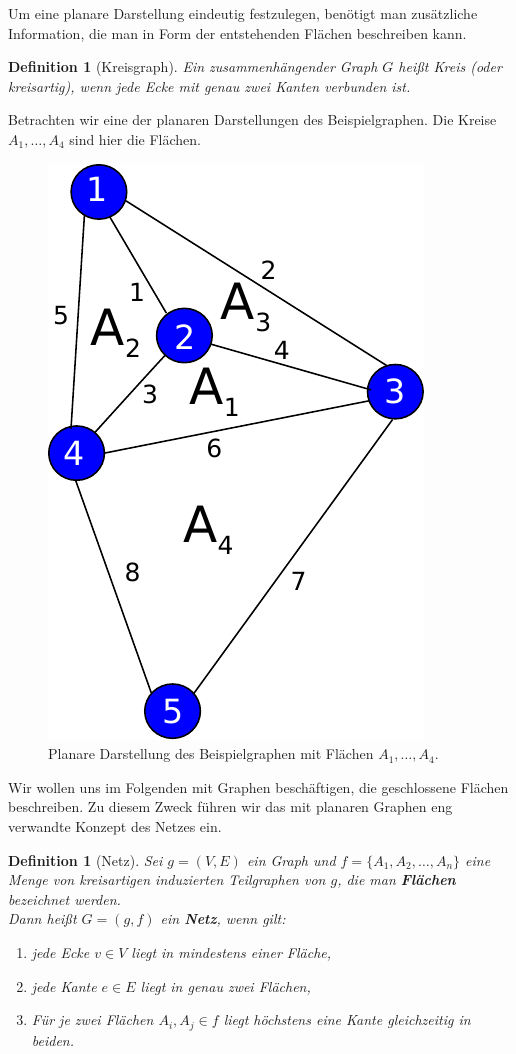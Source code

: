 \documentclass[11pt,a4paper,leqno]{report}
\newtheorem{definition}[theorem]{Definition}
\numberwithin{equation}{chapter}
\begin{document}
\noindent
Um eine planare Darstellung eindeutig festzulegen, benötigt man zusätzliche Information, die man in Form der entstehenden Flächen beschreiben kann.

\begin{definition}[Kreisgraph]
	Ein zusammenhängender Graph $G$ heißt Kreis (oder kreisartig), wenn jede Ecke mit genau zwei Kanten verbunden ist.
\end{definition}
\noindent
Betrachten wir eine der planaren Darstellungen des Beispielgraphen. Die Kreise $A_1,\dots, A_4$ sind hier die Flächen. 
\begin{figure}[H]
	\begin{center}
		\includegraphics[scale=0.3]{Abbildungen/graph_1_planar_flach.pdf}
		\caption{Planare Darstellung des Beispielgraphen mit Flächen $A_1,\dots,A_4$.}
	\end{center}
\end{figure}
\noindent
Wir wollen uns im Folgenden mit Graphen beschäftigen, die geschlossene Flächen beschreiben. Zu diesem Zweck führen wir das mit planaren Graphen eng verwandte Konzept des Netzes ein.
\begin{definition}[Netz]
	Sei $g=(V,E)$ ein Graph und $f=\{A_1, A_2, \dots, A_n\}$ eine Menge von kreisartigen induzierten Teilgraphen von $g$, die man \textbf{Flächen} bezeichnet werden.\\
	Dann heißt $G=(g,f)$ ein \textbf{Netz}, wenn gilt:
	\begin{enumerate}
	\item jede Ecke $v\in V$ liegt in mindestens einer Fläche,
	\item jede Kante $e\in E$ liegt in genau zwei Flächen,
	\item Für je zwei Flächen  $A_i, A_j\in f$ liegt höchstens eine Kante gleichzeitig in beiden.
\end{enumerate}
\end{definition}
\end{document}
